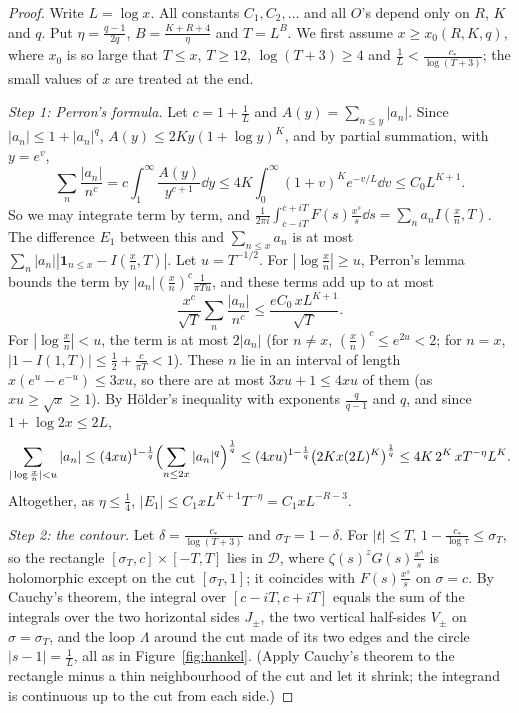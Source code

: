 \begin{proof}
Write $L=\log x$. All constants $C_1,C_2,\dots$ and all $O$'s depend only on $R$, $K$ and $q$. Put $\eta=\frac{q-1}{2q}$, $B=\frac{K+R+4}\eta$ and $T=L^B$. We first assume $x\ge x_0(R,K,q)$, where $x_0$ is so large that $T\le x$, $T\ge12$, $\log(T+3)\ge4$ and $\frac1L<\frac{c_*}{\log(T+3)}$; the small values of $x$ are treated at the end.

\emph{Step 1: Perron's formula.} Let $c=1+\frac1L$ and $A(y)=\sum_{n\le y}|a_n|$. Since $|a_n|\le1+|a_n|^q$, $A(y)\le2Ky(1+\log y)^K$, and by partial summation, with $y=e^v$,
\[
\sum_n\frac{|a_n|}{n^c}=c\int_1^\infty\frac{A(y)}{y^{c+1}}\dd y\le4K\int_0^\infty(1+v)^Ke^{-v/L}\dd v\le C_0L^{K+1}.
\]
So we may integrate term by term, and $\frac1{2\pi i}\int_{c-iT}^{c+iT}F(s)\frac{x^s}s\dd s=\sum_na_nI(\frac xn,T)$. The difference $E_1$ between this and $\sum_{n\le x}a_n$ is at most $\sum_n|a_n||\mathbf 1_{n\le x}-I(\frac xn,T)|$. Let $u=T^{-1/2}$. For $|\log\frac xn|\ge u$, Perron's lemma bounds the term by $|a_n|(\frac xn)^c\frac1{\pi Tu}$, and these terms add up to at most
\[
\frac{x^c}{\sqrt T}\sum_n\frac{|a_n|}{n^c}\le\frac{eC_0\,xL^{K+1}}{\sqrt T}.
\]
For $|\log\frac xn|<u$, the term is at most $2|a_n|$ (for $n\ne x$, $(\frac xn)^c\le e^{2u}<2$; for $n=x$, $|1-I(1,T)|\le\frac12+\frac c{\pi T}<1$). These $n$ lie in an interval of length $x(e^u-e^{-u})\le3xu$, so there are at most $3xu+1\le4xu$ of them (as $xu\ge\sqrt x\ge1$). By Hölder's inequality with exponents $\frac q{q-1}$ and $q$, and since $1+\log2x\le2L$,
\[
\sum_{|\log\frac xn|<u}|a_n|\le(4xu)^{1-\frac1q}\Bigl(\sum_{n\le2x}|a_n|^q\Bigr)^{\frac1q}\le(4xu)^{1-\frac1q}\bigl(2Kx(2L)^K\bigr)^{\frac1q}\le4K\,2^K\,xT^{-\eta}L^K.
\]
Altogether, as $\eta\le\frac14$, $|E_1|\le C_1xL^{K+1}T^{-\eta}=C_1xL^{-R-3}$.

\emph{Step 2: the contour.} Let $\delta=\frac{c_*}{\log(T+3)}$ and $\sigma_T=1-\delta$. For $|t|\le T$, $1-\frac{c_*}{\log\tau}\le\sigma_T$, so the rectangle $[\sigma_T,c]\times[-T,T]$ lies in $\mathcal D$, where $\zeta(s)^zG(s)\frac{x^s}s$ is holomorphic except on the cut $[\sigma_T,1]$; it coincides with $F(s)\frac{x^s}s$ on $\sigma=c$. By Cauchy's theorem, the integral over $[c-iT,c+iT]$ equals the sum of the integrals over the two horizontal sides $J_\pm$, the two vertical half-sides $V_\pm$ on $\sigma=\sigma_T$, and the loop $\Lambda$ around the cut made of its two edges and the circle $|s-1|=\frac1L$, all as in Figure~\ref{fig:hankel}. (Apply Cauchy's theorem to the rectangle minus a thin neighbourhood of the cut and let it shrink; the integrand is continuous up to the cut from each side.)


\end{proof}
